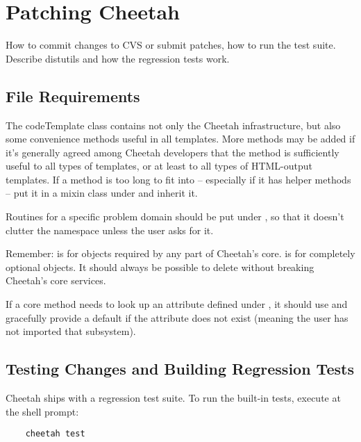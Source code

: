 \section{Patching Cheetah}
\label{patching}

How to commit changes to CVS or submit patches, how to run the test suite.
Describe distutils and how the regression tests work.

\subsection{File Requirements}
\label{patching.fileRequirements}

The code{Template} class contains not only the Cheetah infrastructure, but also
some convenience methods useful in all templates.  More methods may be added if
it's generally agreed among Cheetah developers that the method is sufficiently
useful to all types of templates, or at least to all types of HTML-output
templates.  If a method is too long to fit into  -- especially
if it has helper methods -- put it in a mixin class under 
and inherit it.

Routines for a specific problem domain should be put under
, so that it doesn't clutter the namespace unless the user
asks for it.  

Remember:  is for objects required by any part of Cheetah's
core.   is for completely optional objects.  It should
always be possible to delete  without breaking Cheetah's
core services.

If a core method needs to look up an attribute defined under
, it should use  and gracefully provide a
default if the attribute does not exist (meaning the user has not imported that
subsystem).

\subsection{Testing Changes and Building Regression Tests}
\label{patching.testing}

Cheetah ships with a regression test suite.  To run the built-in tests, 
execute at the shell prompt:
\begin{verbatim}
    cheetah test
\end{verbatim}

